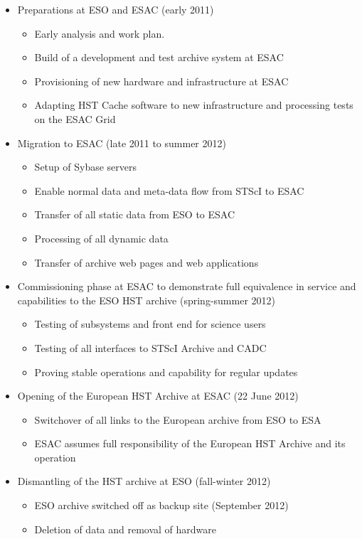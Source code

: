 \begin{itemize} \itemsep0pt \parskip0pt 
\item Preparations at ESO and ESAC (early 2011) 
 \begin{itemize} \itemsep0pt \parskip0pt 
  \item Early analysis and work plan.
  \item Build of a development and test archive system at ESAC
  \item Provisioning of new hardware and infrastructure at ESAC
  \item Adapting HST Cache software  to new infrastructure and processing tests on the ESAC Grid  
  \end{itemize}
\item Migration to ESAC (late 2011 to  summer 2012)
  \begin{itemize} \itemsep0pt \parskip0pt 
  \item Setup of Sybase servers  
   \item Enable normal data and meta-data flow from STScI to ESAC
  \item Transfer of all static data from ESO to ESAC
  \item Processing of all dynamic data
  \item Transfer of archive web pages and web applications
  \end{itemize}
\item Commissioning phase at ESAC to demonstrate full equivalence in service and capabilities to the ESO HST archive (spring-summer 2012)
\begin{itemize} \itemsep0pt \parskip0pt 
\item Testing of subsystems and front end for science users
\item	Testing of all interfaces to STScI Archive and CADC
\item	Proving stable operations and capability for regular updates
\end{itemize} \itemsep0pt \parskip0pt  
\item Opening of the European HST Archive at ESAC  (22 June 2012)
\begin{itemize}
\item Switchover of all links to the European archive from ESO to ESA
\item ESAC assumes full responsibility of the European HST Archive and its operation
\end{itemize} \itemsep0pt \parskip0pt 
\item Dismantling of the HST archive at ESO (fall-winter 2012)
\begin{itemize} \itemsep0pt \parskip0pt 
\item ESO archive switched off as backup site (September 2012) 
\item Deletion of data and removal of hardware
\end{itemize}
\end{itemize}


